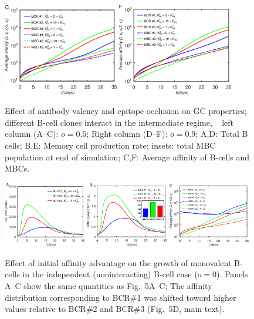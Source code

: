 \begin{figure}[!h]
\includegraphics[width=0.45\textwidth]{../figS1abc/A.eps}
\includegraphics[width=0.45\textwidth]{../figS1def/A.eps}
\caption{Effect of antibody valency and epitope occlusion on GC properties; different B-cell clones interact in the intermediate
regime, \ie~
left column (A--C): $o=0.5$;
Right column (D--F): $o=0.9$;
A,D: Total B cells;
B,E: Memory cell production rate; insets: total MBC population at end of simulation;
C,F: Average affinity of B-cells and MBCs.
}
\label{fig:intavidity}
\end{figure}
\begin{figure}
\centering
\includegraphics[width=0.32\textwidth]{../figS2/gcsize.eps}
\includegraphics[width=0.32\textwidth]{../figS2/dmbc.eps}
\includegraphics[width=0.32\textwidth]{../figS2/A.eps}
\caption{Effect of initial affinity advantage on the growth of monovalent B-cells in the independent
(noninteracting) B-cell case ($o=0$).
Panels A--C show the same quantities as Fig.~5A--C;
The affinity distribution corresponding to BCR\#1 was shifted toward higher values relative to BCR\#2 and BCR\#3
(Fig.~5D, main text).
}
\label{fig:kadv0}
\end{figure}

